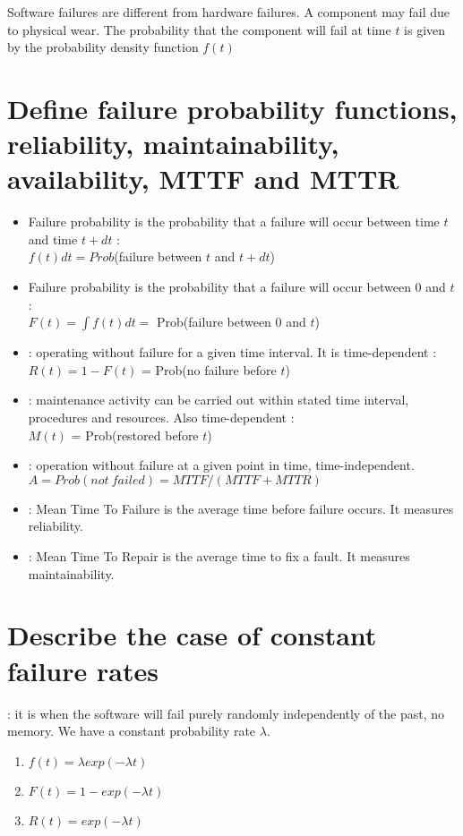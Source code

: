 Software failures are different from hardware failures. A component may fail due to physical wear. The probability that the component will fail at time $t$ is given by the probability density function $f(t)$

\section{Define failure probability functions, reliability, maintainability, availability, MTTF and MTTR}

\begin{itemize}
    \item Failure probability  is the probability that a failure will occur between time $t$ and time $t+dt$ :\\
    $f(t)dt=Prob$(failure between $t$ and $t+dt$)
    \item Failure probability  is the probability that a failure will occur between 0 and $t$ :\\
    $F(t)=\int f(t)dt =$ Prob(failure between $0$ and $t$)
    \item {} : operating without failure for a given time interval. It is time-dependent :\\
    $R(t) = 1-F(t)$ = Prob(no failure before $t$)
    \item {} : maintenance activity can be carried out within stated time interval, procedures and resources. Also time-dependent :\\
    $M(t)$ = Prob(restored before $t$)
    \item {} : operation without failure at a given point in time, time-independent.\\
    $A=Prob(not \ failed)= MTTF/(MTTF+MTTR)$
    \item {} : Mean Time To Failure is the average time before failure occurs. It measures reliability.
    \item {} : Mean Time To Repair is the average time to fix a fault. It measures maintainability.
\end{itemize}

\section{Describe the case of constant failure rates}

: it is when the software will fail purely randomly independently of the past, no memory. We have a constant probability rate $\lambda$.
\begin{enumerate}
    \item $f(t)= \lambda exp(-\lambda t)$
    \item $F(t) = 1-exp(-\lambda t)$
    \item $R(t)= exp(-\lambda t)$
\end{enumerate} 

